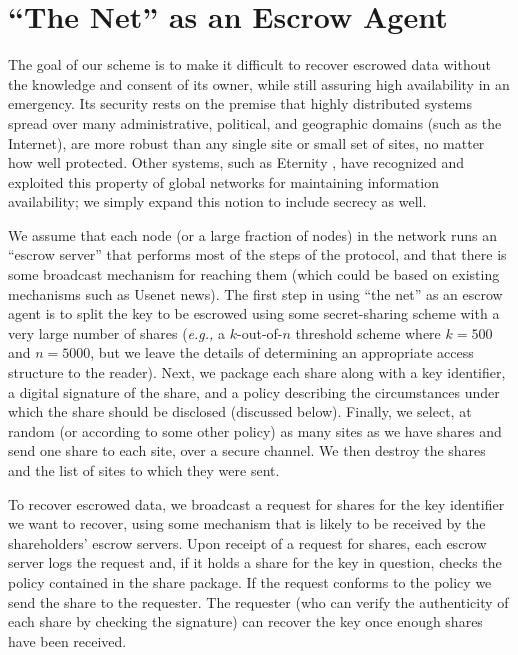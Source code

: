 \section{``The Net'' as an Escrow Agent}

The goal of our scheme is to make it difficult to recover escrowed
data without the knowledge and consent of its owner, while still
assuring high availability in an emergency.  Its security rests on the
premise that highly distributed systems spread over many
administrative, political, and geographic domains (such as the
Internet), are more robust than any single site or small set of sites,
no matter how well protected.  Other systems, such as Eternity
\cite{eternity}, have recognized and exploited this property of global
networks for maintaining information availability; we simply expand
this notion to include secrecy as well.

We assume that each node (or a large fraction of nodes) in the network
runs an ``escrow server'' that performs most of the steps of the
protocol, and that there is some broadcast mechanism for reaching them
(which could be based on existing mechanisms such as Usenet news).
The first step in using ``the net'' as an escrow agent is to split the
key to be escrowed using some secret-sharing scheme \cite{simmons}
with a very large number of shares ({\em e.g.,} a $k$-out-of-$n$
threshold scheme where $k=500$ and $n=5000$, but we leave the details
of determining an appropriate access structure to the reader).  Next,
we package each share along with a key identifier, a digital signature
of the share, and a policy describing the circumstances under which
the share should be disclosed (discussed below).  Finally, we select,
at random (or according to some other policy) as many sites as we have
shares and send one share to each site, over a secure channel.  We
then destroy the shares and the list of sites to which they were sent.

To recover escrowed data, we broadcast a request for shares for the
key identifier we want to recover, using some mechanism that is likely
to be received by the shareholders' escrow servers.  Upon receipt of a
request for shares, each escrow server logs the request and, if it
holds a share for the key in question, checks the policy contained in
the share package.  If the request conforms to the policy we send the
share to the requester.  The requester (who can verify the
authenticity of each share by checking the signature) can recover the
key once enough shares have been received.

